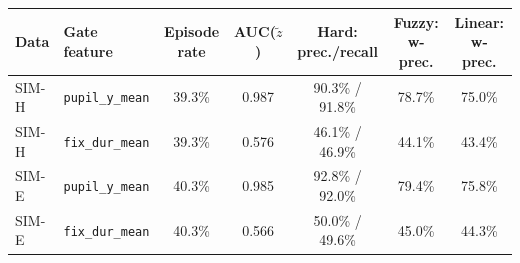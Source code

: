 \begin{tabular}{@{}llccccc@{}}
\toprule
Data & Gate feature & Episode rate & AUC($\tilde z$) & Hard: prec./recall & Fuzzy: w-prec. & Linear: w-prec.\\
\midrule
SIM-H & \texttt{pupil\_y\_mean} & 39.3\% & 0.987 & 90.3\% / 91.8\% & 78.7\% & 75.0\%\\
SIM-H & \texttt{fix\_dur\_mean} & 39.3\% & 0.576 & 46.1\% / 46.9\% & 44.1\% & 43.4\%\\
SIM-E & \texttt{pupil\_y\_mean} & 40.3\% & 0.985 & 92.8\% / 92.0\% & 79.4\% & 75.8\%\\
SIM-E & \texttt{fix\_dur\_mean} & 40.3\% & 0.566 & 50.0\% / 49.6\% & 45.0\% & 44.3\%\\
\bottomrule
\end{tabular}

